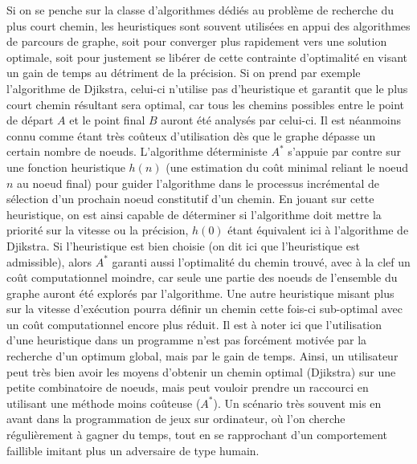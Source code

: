 Si on se penche sur la classe d'algorithmes dédiés au problème de recherche du plus court chemin, les heuristiques sont souvent utilisées en appui des algorithmes de parcours de graphe, soit pour converger plus rapidement vers une solution optimale, soit pour justement se libérer de cette contrainte d'optimalité en visant un gain de temps au détriment de la précision. Si on prend par exemple l'algorithme de Djikstra, celui-ci n'utilise pas d'heuristique et garantit que le plus court chemin résultant sera optimal, car tous les chemins possibles entre le point de départ $A$ et le point final $B$ auront été analysés par celui-ci. Il est néanmoins connu comme étant très coûteux d'utilisation dès que le graphe dépasse un certain nombre de noeuds. L'algorithme déterministe $A^*$ s'appuie par contre sur une fonction heuristique $h(n)$ (une estimation du coût minimal reliant le noeud $n$ au noeud final) pour guider l'algorithme dans le processus incrémental de sélection d'un prochain noeud constitutif d'un chemin. En jouant sur cette heuristique, on est ainsi capable de déterminer si l'algorithme doit mettre la priorité sur la vitesse ou la précision, $h(0)$ étant équivalent ici à l'algorithme de Djikstra. Si l'heuristique est bien choisie (on dit ici que l'heuristique est admissible), alors $A^*$ garanti aussi l'optimalité du chemin trouvé, avec à la clef un coût computationnel moindre, car seule une partie des noeuds de l'ensemble du graphe auront été explorés par l'algorithme. Une autre heuristique misant plus sur la vitesse d'exécution pourra définir un chemin cette fois-ci sub-optimal avec un coût computationnel encore plus réduit. Il est à noter ici que l'utilisation d'une heuristique dans un programme n'est pas forcément motivée par la recherche d'un optimum global, mais par le gain de temps. Ainsi, un utilisateur peut très bien avoir les moyens d'obtenir un chemin optimal (Djikstra) sur une petite combinatoire de noeuds, mais peut vouloir prendre un raccourci en utilisant une méthode moins coûteuse ($A^*$). Un scénario très souvent mis en avant dans la programmation de jeux sur ordinateur, où l'on cherche régulièrement à gagner du temps, tout en se rapprochant d'un comportement faillible imitant plus un adversaire de type humain.

